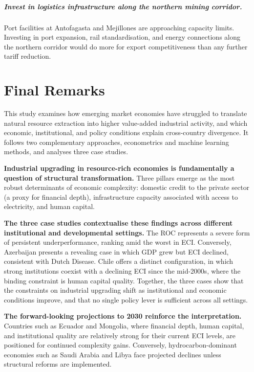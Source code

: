 \documentclass[12pt,a4paper]{report}
\begin{document}
\paragraph{Invest in logistics infrastructure along the northern mining corridor.} Port facilities at Antofagasta and Mejillones are approaching capacity limits. Investing in port expansion, rail standardisation, and energy connections along the northern corridor would do more for export competitiveness than any further tariff reduction.


\chapter{Final Remarks}

This study examines how emerging market economies have struggled to translate natural resource extraction into higher value-added industrial activity, and which economic, institutional, and policy conditions explain cross-country divergence. It follows two complementary approaches, econometrics and machine learning methods, and analyses three case studies.

\textbf{Industrial upgrading in resource-rich economies is fundamentally a question of structural transformation.} Three pillars emerge as the most robust determinants of economic complexity: domestic credit to the private sector (a proxy for financial depth), infrastructure capacity associated with access to electricity, and human capital.

\textbf{The three case studies contextualise these findings across different institutional and developmental settings.} The ROC represents a severe form of persistent underperformance, ranking amid the worst in ECI. Conversely, Azerbaijan presents a revealing case in which GDP grew but ECI declined, consistent with Dutch Disease. Chile offers a distinct configuration, in which strong institutions coexist with a declining ECI since the mid-2000s, where the binding constraint is human capital quality. Together, the three cases show that the constraints on industrial upgrading shift as institutional and economic conditions improve, and that no single policy lever is sufficient across all settings.

\textbf{The forward-looking projections to 2030 reinforce the interpretation.} Countries such as Ecuador and Mongolia, where financial depth, human capital, and institutional quality are relatively strong for their current ECI levels, are positioned for continued complexity gains. Conversely, hydrocarbon-dominant economies such as Saudi Arabia and Libya face projected declines unless structural reforms are implemented.
\end{document}
